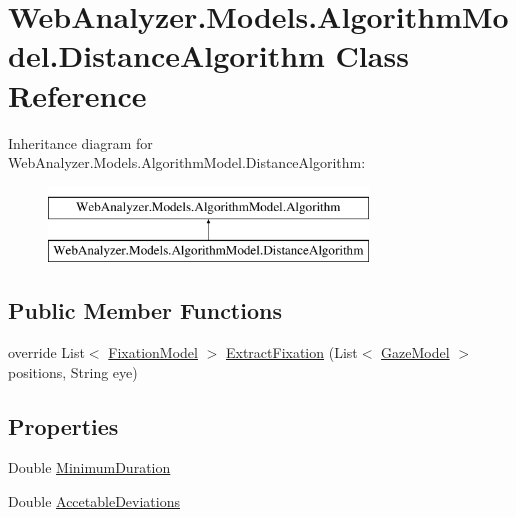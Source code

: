 \hypertarget{class_web_analyzer_1_1_models_1_1_algorithm_model_1_1_distance_algorithm}{}\section{Web\+Analyzer.\+Models.\+Algorithm\+Model.\+Distance\+Algorithm Class Reference}
\label{class_web_analyzer_1_1_models_1_1_algorithm_model_1_1_distance_algorithm}
Inheritance diagram for Web\+Analyzer.\+Models.\+Algorithm\+Model.\+Distance\+Algorithm\+:\begin{figure}[H]
\begin{center}
\leavevmode
\includegraphics[height=2.000000cm]{class_web_analyzer_1_1_models_1_1_algorithm_model_1_1_distance_algorithm}
\end{center}
\end{figure}
\subsection*{Public Member Functions}
\begin{DoxyCompactItemize}
\item 
override List$<$ \hyperlink{class_web_analyzer_1_1_models_1_1_analysis_model_1_1_fixation_model}{Fixation\+Model} $>$ \hyperlink{class_web_analyzer_1_1_models_1_1_algorithm_model_1_1_distance_algorithm_ab8e0d7ad96104e40eb8079d180d1aa0c}{Extract\+Fixation} (List$<$ \hyperlink{class_web_analyzer_1_1_models_1_1_data_model_1_1_gaze_model}{Gaze\+Model} $>$ positions, String eye)
\end{DoxyCompactItemize}
\subsection*{Properties}
\begin{DoxyCompactItemize}
\item 
Double \hyperlink{class_web_analyzer_1_1_models_1_1_algorithm_model_1_1_distance_algorithm_a6dbf956e238fe79191f05d4461ca3a20}{Minimum\+Duration}
\item 
Double \hyperlink{class_web_analyzer_1_1_models_1_1_algorithm_model_1_1_distance_algorithm_abb27c8690d9554003d172ae39f454110}{Accetable\+Deviations}
\end{DoxyCompactItemize}
